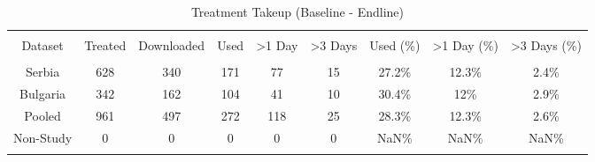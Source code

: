 
\begin{table}[H] \centering 
  \caption{Treatment Takeup (Baseline - Endline)} 
  \label{tbl:Treatment Takeup (Baseline - Endline)} 
\begin{tabular}{@{\extracolsep{5pt}} ccccccccc} 
\\[-1.8ex]\hline 
\hline \\[-1.8ex] 
Dataset & Treated & Downloaded & Used & \textgreater  1 Day & \textgreater  3 Days & Used (\%) & \textgreater  1 Day (\%) & \textgreater  3 Days (\%) \\ 
\hline \\[-1.8ex] 
Serbia & 628 & 340 & 171 &  77 & 15 & 27.2\% & 12.3\% & 2.4\% \\ 
Bulgaria & 342 & 162 & 104 &  41 & 10 & 30.4\% & 12\% & 2.9\% \\ 
Pooled & 961 & 497 & 272 & 118 & 25 & 28.3\% & 12.3\% & 2.6\% \\ 
Non-Study &   0 &   0 &   0 &   0 &  0 & NaN\% & NaN\% & NaN\% \\ 
\hline \\[-1.8ex] 
\end{tabular} 
\end{table} 
